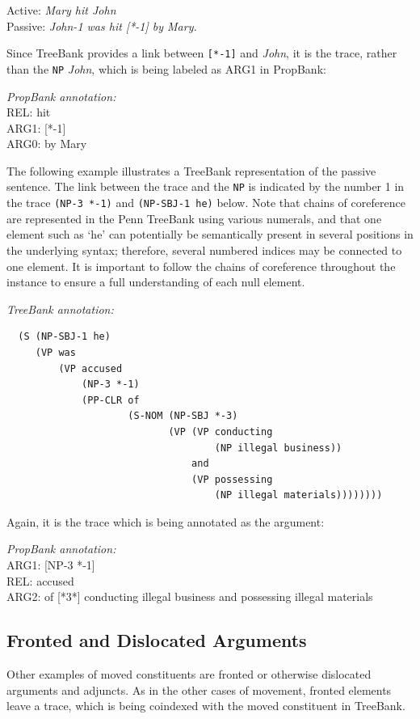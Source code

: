 \documentclass[11pt]{report}
\begin{document}
Active: \textit{Mary hit John} \\
Passive: \textit{John-1 was hit [*-1] by Mary.}

Since TreeBank provides a link between \texttt{[*-1]} and \textit{John},  it is the trace, rather than the \texttt{NP} \textit{John}, which is being labeled as ARG1 in PropBank: 

\textit{PropBank annotation:}\\
REL:            hit\\
ARG1:        	[*-1]\\
ARG0:           by Mary

The following example illustrates a TreeBank representation of the passive sentence. The link between the trace and the \texttt{NP} is indicated by the number 1 in the trace \texttt{(NP-3 *-1)} and \texttt{(NP-SBJ-1 he)} below.  Note that chains of coreference are represented in the Penn TreeBank using various numerals, and that one element such as `he' can potentially be semantically present in several positions in the underlying syntax; therefore, several numbered indices may be connected to one element.  It is important to follow the chains of coreference throughout the instance to ensure a full understanding of each null element.  

\textit{TreeBank annotation:}
\begin{verbatim}
  (S (NP-SBJ-1 he)
     (VP was
         (VP accused
             (NP-3 *-1)
             (PP-CLR of
                     (S-NOM (NP-SBJ *-3)
                            (VP (VP conducting
                                    (NP illegal business))
                                and
                                (VP possessing
                                    (NP illegal materials))))))))
\end{verbatim}

Again, it is the trace which is being annotated as the argument:

\textit{PropBank annotation:}\\
ARG1: [NP-3 *-1] \\
REL: accused\\
ARG2: of [*3*] conducting illegal business and possessing illegal materials

\subsection{Fronted and Dislocated Arguments}

Other examples of moved constituents are fronted or otherwise dislocated arguments and adjuncts. As in the other cases of movement, fronted elements leave a trace, which is being coindexed with the moved constituent in TreeBank. 
\end{document}
